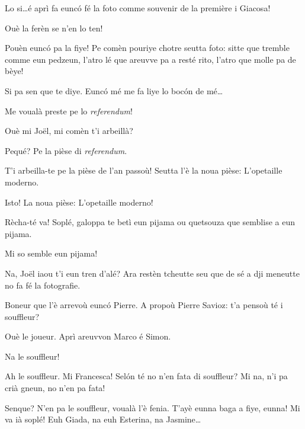\begin{drama}
\Joellespeaks Lo si\ldots é aprì fa eunc\'o fé la foto comme souvenir de la première i Giacosa!

\Francescaspeaks Ouè la ferèn se n'en lo ten!

 \Joellespeaks Pouèn euncó pa la fiye! Pe comèn pouriye chotre seutta foto: sitte  que tremble comme eun pe\-dzeun, l’atro lé  que areuvve pa a resté rito, l'atro que molle pa de bèye!
 
 \Francescaspeaks Si pa sen que te diye. Euncó mé me fa liye lo boc\'on de mé\ldots
 

\Joelspeaks{} Me voualà preste pe lo \textit{referendum}!

\Joellespeaks Ouè mi Jo\"{e}l, mi comèn t'i arbeillà?

\Joelspeaks Pequé? Pe la pièse di \textit{referendum}.

\Joellespeaks T'i arbeilla-te pe la pièse de l'an passoù! Seutta l'è la noua pièse: \og L’opetaille moderno\fg.

\Joelspeaks Isto! La noua pièse: \og L'opetaille moderno\fg!

\Joellespeaks Rècha-té va! Soplé, galoppa te betì eun pijama ou que\-tsouza que semblise a eun pijama.

\Joelspeaks Mi so semble eun pijama!


\Francescaspeaks{} Na, Jo\"{e}l iaou t'i eun tren d'alé? Ara restèn tcheut\-te seu que de sé a dji meneutte no fa fé la fotografie. 


\Francescaspeaks Boneur que l'è arrevoù euncó Pierre.  A propoù Pierre Savioz: t'a pensoù té i souffleur?

\Pierrespeaks Ouè le joueur. Aprì areuvvon Marco é Simon.

\Francescaspeaks Na le souffleur!
 
\Pierrespeaks Ah le souffleur. Mi Francesca! Sel\'on té no n'en fata di souffleur? Mi na, n'i pa crià gneun, no n'en pa fata!
 
\Cimaspeaks Senque? N'en pa le souffleur, voualà l'è fenia. T'ayè eunna baga a fiye, eunna!  Mi va ià soplé!  Euh Giada, na euh Esterina, na Jasmine\ldots


\end{drama}
